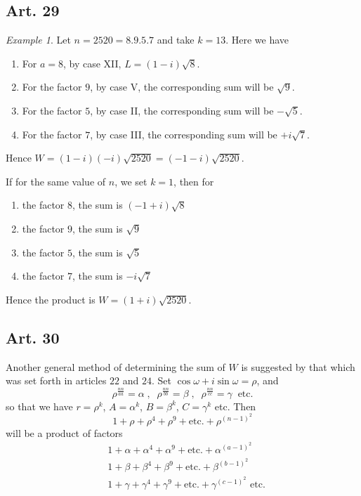 \documentclass{book}
\theoremstyle{plain}
\theoremstyle{remark}
\newtheorem*{example}{Example}
\begin{document}
\subsection*{Art. 29}

\begin{example} Let $n=2520 = 8.9.5.7$ and take $k=13$.  Here we have 
\begin{enumerate}
\item[ ] For $a = 8$, by case XII, $L = (1-i)\sqrt{8}$.
\item[ ] For the factor $9$, by case V, the corresponding sum will be $\sqrt{9}$.
\item[ ] For the factor $5$, by case II,  the corresponding sum will be $-\sqrt{5}$. 
\item[ ] For the factor $7$, by case III, the corresponding sum will be $+i\sqrt{7}$. 
\end{enumerate}
Hence $W = (1-i)(-i) \sqrt{2520} = (-1-i)\sqrt{2520}$.  

If for the same value of $n$, we set $k=1$, then for
\begin{enumerate}
\item[ ] the factor $8$, the sum is $(-1+i)\sqrt{8}$
\item[ ] the factor $9$, the sum is $\sqrt{9}$
\item[ ] the factor $5$, the sum is $\sqrt{5}$
\item[ ] the factor $7$, the sum is $-i\sqrt{7}$
\end{enumerate}
Hence the product is $W = (1+i)\sqrt{2520}$. 
\end{example}

\subsection*{Art. 30}

Another general method of determining the sum of $W$ is suggested by that which was set forth in articles $22$ and $24$.  Set $\cos \omega + i \sin \omega = \rho$, and
\[ \rho^{\frac{nn}{aa}} = \alpha \;, \;\; \rho^{\frac{nn}{bb}} = \beta \;, \;\; \rho^{\frac{nn}{cc}} = \gamma \; \; \textrm{etc.} \]
so that we have $r = \rho^k$, $A = \alpha^k$, $B = \beta^k$, $C = \gamma^k$ etc.  Then 
\[ 1 + \rho + \rho^4 + \rho^9 + \textrm{etc.} + \rho^{(n-1)^2} \]
will be a product of factors 
\begin{align*}
& 1 + \alpha + \alpha^4 + \alpha^9 + \textrm{etc.} + \alpha^{(a-1)^2} \\
 &1 + \beta + \beta^4 + \beta^9 + \textrm{etc.} + \beta^{(b-1)^2} \\
& 1 + \gamma + \gamma^4 + \gamma^9 + \textrm{etc.} + \gamma^{(c-1)^2} \textrm{ etc.} 
\end{align*} 
\end{document}
